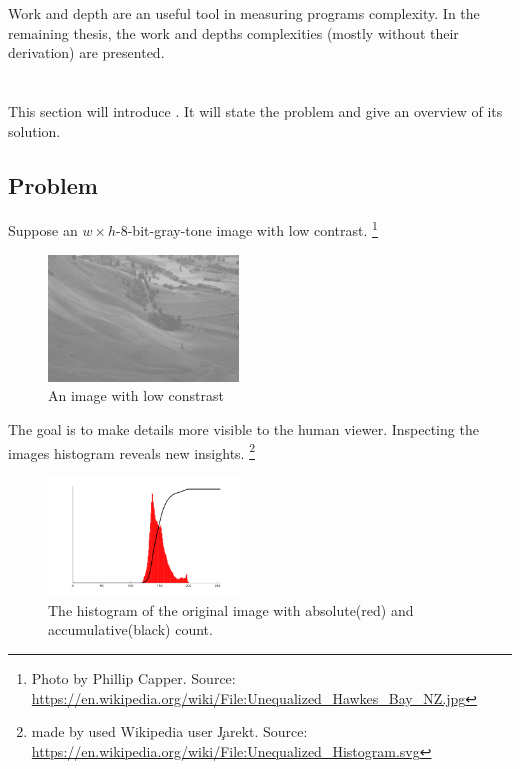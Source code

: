   Work and depth are an useful tool in measuring
  programs complexity. In the remaining thesis,
  the work and depths complexities (mostly without their derivation)
  are presented.


\section{\algo}
  \label{section:hbalanceintro}
  This section will introduce \algo. It will state the problem and give an overview of its solution.
  
  \subsection*{Problem}
    Suppose an $w \times h$-8-bit-gray-tone image with low contrast.
    \footnote{Photo by Phillip Capper. Source: \url{https://en.wikipedia.org/wiki/File:Unequalized_Hawkes_Bay_NZ.jpg}}
    
    \begin{figure}[h]
      \centering
      \includegraphics[width=0.45\textwidth]{img-org}
      \caption{An image with low constrast}
      \label{fig:img-org}
    \end{figure}
    The goal is to make details more visible to the human viewer.
    Inspecting the images histogram reveals new insights.
    \footnote{made by used Wikipedia user \c{Jarekt}. Source: \url{https://en.wikipedia.org/wiki/File:Unequalized_Histogram.svg}}
    
    \begin{figure}[h]
      \centering
      \includegraphics[width=0.45\textwidth]{hist-org}
      \caption{The histogram of the original image with absolute(red) and accumulative(black) count.}
      \label{fig:hist-org}
    \end{figure}
    
